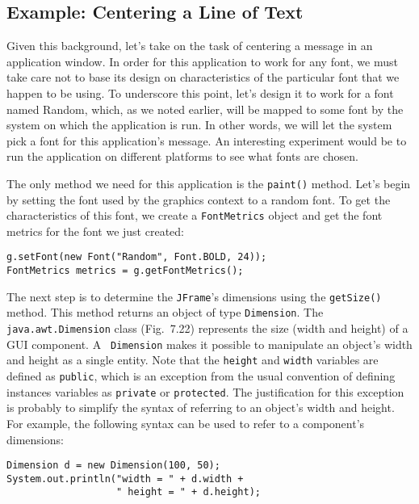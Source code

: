\subsection{Example: Centering a Line of Text}
\noindent Given this background, let's take on the task of centering a message
in an application window.  In order for this application to work for any font, we
must take care not to base its design on characteristics of the
particular font that we happen to be using.   To underscore this point,
let's design it to work for a font named Random, which, as we noted
earlier, will be mapped to some font by the system on which the application
is run.  In other words, we will let the system pick a font for this
application's message.  An interesting experiment would be to run the application
on different platforms to see what fonts are chosen.

The only method we need for this application is the {\tt paint()} method.
Let's begin by setting the font used by the graphics context to a random
font.  To get the characteristics of this font, we create a {\tt FontMetrics}
object and get the font metrics for the font we just created:

\begin{jjjlisting}
\begin{lstlisting}
g.setFont(new Font("Random", Font.BOLD, 24));
FontMetrics metrics = g.getFontMetrics();
\end{lstlisting}
\end{jjjlisting}

\noindent The next step is to determine the {\tt JFrame}'s dimensions
using the {\tt getSize()} method. This method returns an object of
type {\tt Dimension}.  The {\tt java.awt.Dimension} class (Fig.~7.22)
represents the size (width and height) of a GUI component.  A {\tt
Dimension} makes it possible to manipulate an object's width and
height as a single entity.  Note that the {\tt height} and {\tt width}
variables are defined as {\tt public}, which is an exception from the
usual convention of defining instances variables as {\tt private} or
{\tt protected}. The justification for this exception is probably
to simplify the syntax of referring to an object's width and height.
For example, the following syntax can be used to refer to a component's
dimensions:

\begin{jjjlisting}
\begin{lstlisting}
Dimension d = new Dimension(100, 50);
System.out.println("width = " + d.width + 
                   " height = " + d.height);
\end{lstlisting}
\end{jjjlisting}

